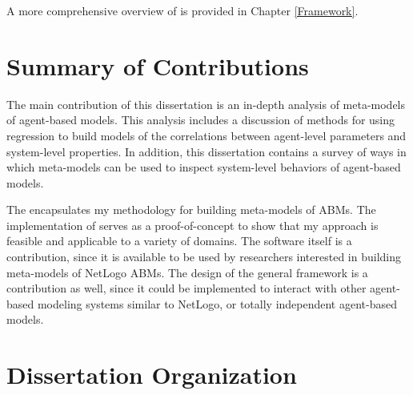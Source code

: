 A more comprehensive overview of \fw is provided in Chapter \ref{Framework}.



\section{Summary of Contributions}


The main contribution of this dissertation is an in-depth analysis of meta-models of agent-based models.
This analysis includes a discussion of methods for using regression to build models of the correlations between agent-level parameters and system-level properties. 
In addition, this dissertation contains a survey of ways in which meta-models can be used to inspect system-level behaviors of agent-based models.

The \framework encapsulates my methodology for building meta-models of ABMs.
The implementation of \fw serves as a proof-of-concept to show that my approach is feasible and applicable to a variety of domains.
The software itself is a contribution, since it is available to be used by researchers interested in building meta-models of NetLogo ABMs.
The design of the general framework is a contribution as well, since it could be implemented to interact with other agent-based modeling systems similar to NetLogo, or totally independent agent-based models.


\section{Dissertation Organization}

